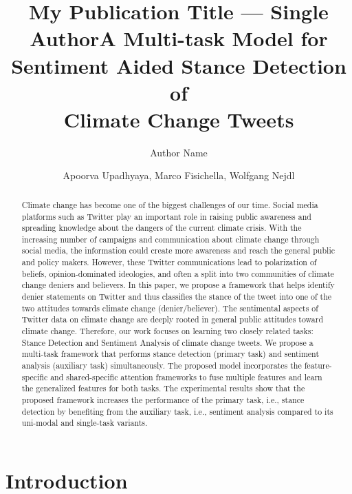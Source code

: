 \documentclass[letterpaper]{article}
\title{My Publication Title --- Single Author}
\author {
    Author Name \\
}
\author {
    Apoorva Upadhyaya,
    Marco Fisichella,
    Wolfgang Nejdl \\
}
\title{A Multi-task Model for Sentiment Aided Stance Detection of \\Climate Change Tweets}
\begin{document}
\maketitle

\begin{abstract}
Climate change has become one of the biggest challenges of our time. Social media platforms such as Twitter play an important role in raising public awareness and spreading knowledge about the dangers of the current climate crisis. With the increasing number of campaigns and communication about climate change through social media, the information could create more awareness and reach the general public and policy makers. However, these Twitter communications lead to polarization of beliefs, opinion-dominated ideologies, and often a split into two communities of climate change deniers and believers. In this paper, we propose a framework that helps identify denier statements on Twitter and thus classifies the stance of the tweet into one of the two attitudes towards climate change (denier/believer). The sentimental aspects of Twitter data on climate change are deeply rooted in general public attitudes toward climate change. Therefore, our work focuses on learning two closely related tasks: Stance Detection and Sentiment Analysis of climate change tweets. We propose a multi-task framework that performs stance detection (primary task) and sentiment analysis (auxiliary task) simultaneously. The proposed model incorporates the feature-specific and shared-specific attention frameworks to fuse multiple features and learn the generalized features for both tasks. The experimental results show that the proposed framework increases the performance of the primary task, i.e., stance detection by benefiting from the auxiliary task, i.e., sentiment analysis compared to its uni-modal and single-task variants.
\end{abstract}
\section{Introduction}\label{intro}
\end{document}
